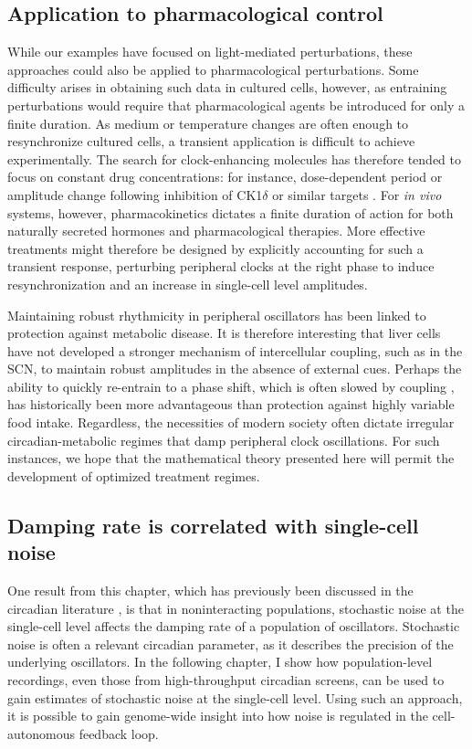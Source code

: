 \subsection{Application to pharmacological control}
While our examples have focused on light-mediated perturbations, these approaches could also be applied to pharmacological perturbations.
Some difficulty arises in obtaining such data in cultured cells, however, as entraining perturbations would require that pharmacological agents be introduced for only a finite duration.
As medium or temperature changes are often enough to resynchronize cultured cells, a transient application is difficult to achieve experimentally.
The search for clock-enhancing molecules has therefore tended to focus on constant drug concentrations: for instance, dose-dependent period or amplitude change following inhibition of CK1$\delta$ or similar targets \cite{Chen2013}.
For {\itshape in vivo} systems, however, pharmacokinetics dictates a finite duration of action for both naturally secreted hormones and pharmacological therapies.
More effective treatments might therefore be designed by explicitly accounting for such a transient response, perturbing peripheral clocks at the right phase to induce resynchronization and an increase in single-cell level amplitudes.

Maintaining robust rhythmicity in peripheral oscillators has been linked to protection against metabolic disease.
It is therefore interesting that liver cells have not developed a stronger mechanism of intercellular coupling, such as in the SCN, to maintain robust amplitudes in the absence of external cues.
Perhaps the ability to quickly re-entrain to a phase shift, which is often slowed by coupling \cite{Abraham2010}, has historically been more advantageous than protection against highly variable food intake.
Regardless, the necessities of modern society often dictate irregular circadian-metabolic regimes that damp peripheral clock oscillations.
For such instances, we hope that the mathematical theory presented here will permit the development of optimized treatment regimes.

\subsection{Damping rate is correlated with single-cell noise}

One result from this chapter, which has previously been discussed in the circadian literature \cite{Rougemont2007}, is that in noninteracting populations, stochastic noise at the single-cell level affects the damping rate of a population of oscillators. 
Stochastic noise is often a relevant circadian parameter, as it describes the precision of the underlying oscillators. 
In the following chapter, I show how population-level recordings, even those from high-throughput circadian screens, can be used to gain estimates of stochastic noise at the single-cell level. 
Using such an approach, it is possible to gain genome-wide insight into how noise is regulated in the cell-autonomous feedback loop. 
